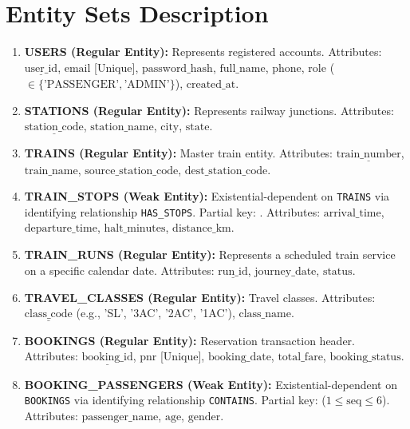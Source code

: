 \documentclass[12pt,a4paper]{report}
\begin{document}
\section{Entity Sets Description}
\begin{enumerate}
    \item \textbf{USERS (Regular Entity):} Represents registered accounts. Attributes: $\underline{\text{user\_id}}$, $\text{email}$ [Unique], $\text{password\_hash}$, $\text{full\_name}$, $\text{phone}$, $\text{role}$ ($\in \{\text{'PASSENGER'}, \text{'ADMIN'}\}$), $\text{created\_at}$.
    \item \textbf{STATIONS (Regular Entity):} Represents railway junctions. Attributes: $\underline{\text{station\_code}}$, $\text{station\_name}$, $\text{city}$, $\text{state}$.
    \item \textbf{TRAINS (Regular Entity):} Master train entity. Attributes: $\underline{\text{train\_number}}$, $\text{train\_name}$, $\text{source\_station\_code}$, $\text{dest\_station\_code}$.
    \item \textbf{TRAIN\_STOPS (Weak Entity):} Existential-dependent on \texttt{TRAINS} via identifying relationship \texttt{HAS\_STOPS}. Partial key: . Attributes: $\text{arrival\_time}$, $\text{departure\_time}$, $\text{halt\_minutes}$, $\text{distance\_km}$.
    \item \textbf{TRAIN\_RUNS (Regular Entity):} Represents a scheduled train service on a specific calendar date. Attributes: $\underline{\text{run\_id}}$, $\text{journey\_date}$, $\text{status}$.
    \item \textbf{TRAVEL\_CLASSES (Regular Entity):} Travel classes. Attributes: $\underline{\text{class\_code}}$ (e.g., 'SL', '3AC', '2AC', '1AC'), $\text{class\_name}$.
    \item \textbf{BOOKINGS (Regular Entity):} Reservation transaction header. Attributes: $\underline{\text{booking\_id}}$, $\text{pnr}$ [Unique], $\text{booking\_date}$, $\text{total\_fare}$, $\text{booking\_status}$.
    \item \textbf{BOOKING\_PASSENGERS (Weak Entity):} Existential-dependent on \texttt{BOOKINGS} via identifying relationship \texttt{CONTAINS}. Partial key:  ($1 \le \text{seq} \le 6$). Attributes: $\text{passenger\_name}$, $\text{age}$, $\text{gender}$.
\end{enumerate}
\end{document}

